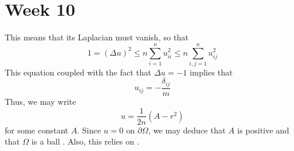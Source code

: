 \documentclass[12pt]{article}
\begin{document}
 \section*{Week 10}
 This means that its Laplacian must vanish, so that
 \[
1 = (\Delta u)^2 \leq n \sum_{i=1}^n u_{ii}^2 \leq n \sum_{i,j = 1}^n u_{ij}^2
 \] This equation coupled with the fact that \(\Delta u = -1\) implies that
 \[
 u_{ij} = -\frac{\delta_{ij}}{m}
 \] Thus, we may write
 \[
 u = \frac{1}{2n}(A - r^2)
 \] for some constant $A$. Since $u = 0$ on $\partial{\Omega}$, we may deduce that $A$ is positive and that $\Omega$ is a ball \cite{weinberger71}. Also, this relies on \cite{weinberger84}.

 
\end{document}
